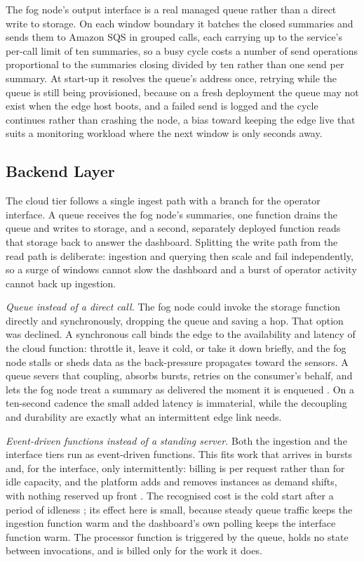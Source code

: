 \documentclass[conference]{IEEEtran}
\begin{document}
The fog node's output interface is a real managed queue rather than a direct write to storage. On each window boundary it batches the closed summaries and sends them to Amazon SQS in grouped calls, each carrying up to the service's per-call limit of ten summaries, so a busy cycle costs a number of send operations proportional to the summaries closing divided by ten rather than one send per summary. At start-up it resolves the queue's address once, retrying while the queue is still being provisioned, because on a fresh deployment the queue may not exist when the edge host boots, and a failed send is logged and the cycle continues rather than crashing the node, a bias toward keeping the edge live that suits a monitoring workload where the next window is only seconds away.

\subsection{Backend Layer}

The cloud tier follows a single ingest path with a branch for the operator interface. A queue receives the fog node's summaries, one function drains the queue and writes to storage, and a second, separately deployed function reads that storage back to answer the dashboard. Splitting the write path from the read path is deliberate: ingestion and querying then scale and fail independently, so a surge of windows cannot slow the dashboard and a burst of operator activity cannot back up ingestion.

\textit{Queue instead of a direct call.} The fog node could invoke the storage function directly and synchronously, dropping the queue and saving a hop. That option was declined. A synchronous call binds the edge to the availability and latency of the cloud function: throttle it, leave it cold, or take it down briefly, and the fog node stalls or sheds data as the back-pressure propagates toward the sensors. A queue severs that coupling, absorbs bursts, retries on the consumer's behalf, and lets the fog node treat a summary as delivered the moment it is enqueued \cite{hohpe2003}. On a ten-second cadence the small added latency is immaterial, while the decoupling and durability are exactly what an intermittent edge link needs.

\textit{Event-driven functions instead of a standing server.} Both the ingestion and the interface tiers run as event-driven functions. This fits work that arrives in bursts and, for the interface, only intermittently: billing is per request rather than for idle capacity, and the platform adds and removes instances as demand shifts, with nothing reserved up front \cite{armbrust2010}. The recognised cost is the cold start after a period of idleness \cite{wang2018}; its effect here is small, because steady queue traffic keeps the ingestion function warm and the dashboard's own polling keeps the interface function warm. The processor function is triggered by the queue, holds no state between invocations, and is billed only for the work it does.
\end{document}
